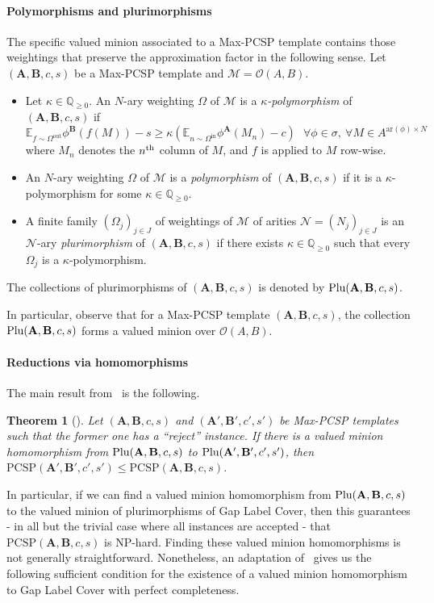 \documentclass[a4paper,11pt]{article}
\newtheorem{theorem}{Theorem}[section]
\theoremstyle{definition}
\newcommand{\mnn}[1]{\mathscr{#1}}
\newcommand{\ex}[1]{\mathbb{E}_{#1}}
\newcommand{\bfa}{\mathbf{A}}
\newcommand{\bfb}{\mathbf{B}}
\newcommand{\abcs}{(\bfa,\bfb,c,s)}
\newcommand{\pcsp}{\mathrm{PCSP}}
\newcommand{\ar}{\mathrm{ar}}
\newcommand{\plu}{\textnormal{Plu}}
\newcommand{\OmegaI}{\Omega^{\mathrm{in}}}
\newcommand{\OmegaO}{\Omega^{\mathrm{out}}}
\newcommand{\IO}{\kappa}
\begin{document}
\paragraph{Polymorphisms and plurimorphisms}
The specific valued minion associated to a Max-PCSP 
template contains those
weightings that preserve the approximation factor in the following sense. Let
$\abcs$ be a Max-PCSP template and $\mnn M = \mathscr{O}(A,B)$.  
   \begin{itemize}
   \item Let  $\IO \in \mathbb{Q}_{\geq 0}$. An $N$-ary weighting $\Omega$ of $\mnn M$ is
   a \emph{$\IO$-polymorphism} of $\abcs$ if 
       \[ 
   \ex{f \sim \OmegaO} \phi^{\bfb}( f (M) ) - s \geq \IO ( \ex{n \sim \OmegaI}\phi^{\bfa}(M_n)-c) \ \ \ \forall \phi \in \sigma, \ \forall M \in A^{\ar(\phi) \times N}  
       \] where $M_n$ denotes the $n^{\textnormal{th}}$ column of $M$, and $f$ is applied to $M$ row-wise.
   \item An $N$-ary weighting $\Omega$ of $\mnn M$ is
   a \emph{polymorphism} of $\abcs$ if it is a $\IO$-polymorphism for some $\IO \in \mathbb{Q}_{\geq 0}$. 
    \item A finite family $(\Omega_j)_{j \in J}$ of weightings of $\mnn M$ of arities $\mathcal{N}= (N_j)_{j \in J}$  is an $\mathcal{N}$-ary \emph{plurimorphism}  of $\abcs$ if there exists $\IO \in \mathbb{Q}_{\geq 0}$ such that every $\Omega_j$ is a $\IO$-polymorphism. 
\end{itemize}
The collections of plurimorphisms of $\abcs$ is  denoted by $\plu \abcs$.

In particular, observe that for a Max-PCSP template $\abcs$, the collection $\plu\abcs$ forms a valued minion over $\mathscr{O}(A,B)$.


\paragraph{Reductions via homomorphisms}
The main result from~\cite{Barto24:lics} is the following.

\begin{theorem}[\cite{Barto24:lics}] \label{th:valued-reduction-via-homos}
    Let $\abcs$ and $(\bfa',\bfb',c',s')$ be Max-PCSP templates 
    such that the former one has a ``reject'' instance.
    If there is a valued minion homomorphism from $\plu\abcs$ to $\plu(\bfa',\bfb',c',s')$, then $\pcsp(\bfa',\bfb',c',s') \leq \pcsp\abcs$.     
\end{theorem}


In particular, if we can find a valued minion homomorphism from $\plu\abcs$ to the valued minion of plurimorphisms of Gap Label Cover, then this guarantees - in all but the trivial case where all instances are accepted - that $\pcsp\abcs$ is NP-hard. Finding these valued minion homomorphisms is not generally straightforward. Nonetheless, an adaptation of~\cite[Theorem 5.8]{Barto24:lics} gives us the following sufficient condition for the existence of a valued minion homomorphism to Gap Label Cover with perfect completeness. 
\end{document}
